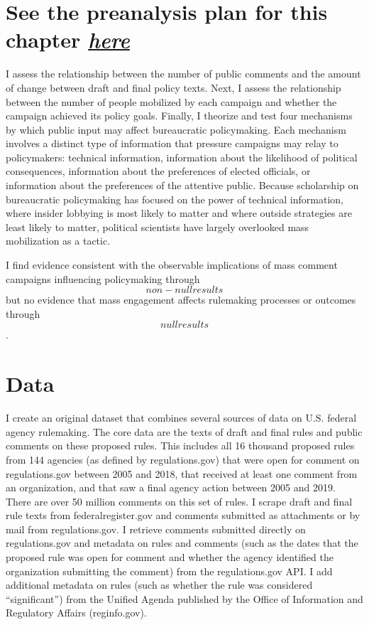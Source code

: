 \documentclass[
]{book}
\begin{document}
\hypertarget{see-the-preanalysis-plan-for-this-chapter-here}{%
\section{\texorpdfstring{See the preanalysis plan for this chapter \href{https://github.com/judgelord/dissertation/blob/master/04-influence/preanalysis.pdf}{\emph{here}}}{See the preanalysis plan for this chapter here}}\label{see-the-preanalysis-plan-for-this-chapter-here}}

I assess the relationship between the number of
public comments and the amount of change between draft and final policy
texts. Next, I assess the relationship between the number of people
mobilized by each campaign and whether the campaign achieved its policy
goals. Finally, I theorize and test four mechanisms by which public
input may affect bureaucratic policymaking. Each mechanism involves a
distinct type of information that pressure campaigns may relay to
policymakers: technical information, information about the likelihood of
political consequences, information about the preferences of elected
officials, or information about the preferences of the attentive public.
Because scholarship on bureaucratic policymaking has focused on the
power of technical information, where insider lobbying is most likely to
matter and where outside strategies are least likely to matter,
political scientists have largely overlooked mass mobilization as a
tactic.

I find evidence consistent with the observable implications of mass
comment campaigns influencing policymaking through \[non-null results\]
but no evidence that mass engagement affects rulemaking processes or
outcomes through \[null results\].

\hypertarget{data}{%
\section{Data}\label{data}}

I create an original dataset that combines several sources of data on U.S. federal agency rulemaking.
The core data are the texts of draft and final rules and public comments on these proposed rules.
This includes all 16 thousand proposed rules from 144 agencies (as defined by regulations.gov) that were open for comment on regulations.gov between 2005 and 2018, that received at least one comment from an organization, and that saw a final agency action between 2005 and 2019.
There are over 50 million comments on this set of rules.
I scrape draft and final rule texts from federalregister.gov and comments submitted as attachments or by mail from regulations.gov.
I retrieve comments submitted directly on regulations.gov and metadata on rules and comments (such as the dates that the proposed rule was open for comment and whether the agency identified the organization submitting the comment) from the regulations.gov API.
I add additional metadata on rules (such as whether the rule was considered ``significant'') from the Unified Agenda published by the Office of Information and Regulatory Affairs (reginfo.gov).
\end{document}
